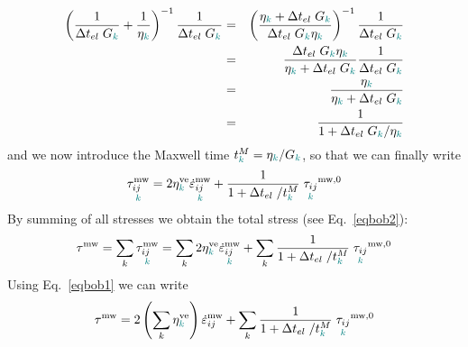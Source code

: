 \begin{eqnarray}
\left( \frac{1}{\Delta t_{el} \; G_{\color{teal}k} } 
+ \frac{1}{\eta_{\color{teal}k}} \right) ^{-1}
\frac{1}{ \Delta t_{el} \; G_{\color{teal}k}  }
&=&
\left( \frac{
\eta_{\color{teal}k} + \Delta t_{el} \; G_{\color{teal}k} 
}{\Delta t_{el} \; G_{\color{teal}k} \eta_{\color{teal}k}} \right) ^{-1}
\frac{1}{ \Delta t_{el} \; G_{\color{teal}k}  } \nonumber\\
&=&
\frac
{\Delta t_{el} \; G_{\color{teal}k} \eta_{\color{teal}k}} 
{\eta_{\color{teal}k} + \Delta t_{el} \; G_{\color{teal}k} }
\frac{1}{ \Delta t_{el} \; G_{\color{teal}k}  } \nonumber\\
&=&
\frac{ \eta_{\color{teal}k}} 
{\eta_{\color{teal}k} + \Delta t_{el} \; G_{\color{teal}k} } \nonumber\\
&=&
\frac{ 1} 
{1 + \Delta t_{el} \; G_{\color{teal}k} /\eta_{\color{teal}k}
} 
\end{eqnarray}
and we now introduce the Maxwell time $t_{{\color{teal}k}}^M = \eta_{{\color{teal}k}} / G_{{\color{teal}k}} $, so that 
we can finally write
\[
\underset{\color{teal} k}{\tau_{ij}^{\rm mw}}
= 2 
\eta^{\rm ve}_{\color{teal}k}
\underset{\color{teal}k}{\dot\varepsilon_{ij}^{\rm mw}}
+
\frac{ 1}{1 + \Delta t_{el} \; / t_{{\color{teal}k}}^M }
\;
\underset{\color{teal} k}{\tau_{ij}}^{\rm mw,0}
\]
By summing of all stresses we obtain the total stress 
(see Eq.~\eqref{eqbob2}):
\[
\tau^{\rm mw}
=\sum_k \underset{\color{teal} k}{\tau_{ij}^{\rm mw}}
=\sum_k
 2 
\eta^{\rm ve}_{\color{teal}k}
\underset{\color{teal}k}{\dot\varepsilon_{ij}^{\rm mw}}
+
\sum_k
\frac{ 1}{1 + \Delta t_{el} \; / t_{{\color{teal}k}}^M }
\;
\underset{\color{teal} k}{\tau_{ij}}^{\rm mw,0}
\]
Using Eq.~\eqref{eqbob1} we can write
\[
\tau^{\rm mw}
= 2 \left(\sum_k  \eta^{\rm ve}_{\color{teal}k} \right)
\dot\varepsilon_{ij}^{\rm mw}
+
\sum_k
\frac{ 1}{1 + \Delta t_{el} \; / t_{{\color{teal}k}}^M }
\;
\underset{\color{teal} k}{\tau_{ij}}^{\rm mw,0}
\]



























\newpage
